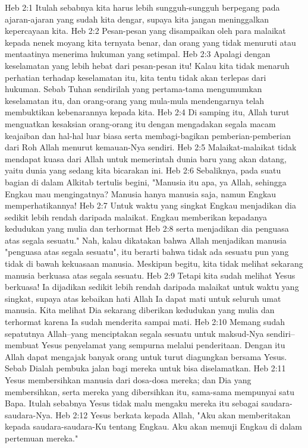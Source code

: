 Heb 2:1  Itulah sebabnya kita harus lebih sungguh-sungguh berpegang pada ajaran-ajaran yang sudah kita dengar, supaya kita jangan meninggalkan kepercayaan kita.
Heb 2:2  Pesan-pesan yang disampaikan oleh para malaikat kepada nenek moyang kita ternyata benar, dan orang yang tidak menuruti atau mentaatinya menerima hukuman yang setimpal.
Heb 2:3  Apalagi dengan keselamatan yang lebih hebat dari pesan-pesan itu! Kalau kita tidak menaruh perhatian terhadap keselamatan itu, kita tentu tidak akan terlepas dari hukuman. Sebab Tuhan sendirilah yang pertama-tama mengumumkan keselamatan itu, dan orang-orang yang mula-mula mendengarnya telah membuktikan kebenarannya kepada kita.
Heb 2:4  Di samping itu, Allah turut menguatkan kesaksian orang-orang itu dengan mengadakan segala macam keajaiban dan hal-hal luar biasa serta membagi-bagikan pemberian-pemberian dari Roh Allah menurut kemauan-Nya sendiri.
Heb 2:5  Malaikat-malaikat tidak mendapat kuasa dari Allah untuk memerintah dunia baru yang akan datang, yaitu dunia yang sedang kita bicarakan ini.
Heb 2:6  Sebaliknya, pada suatu bagian di dalam Alkitab tertulis begini, "Manusia itu apa, ya Allah, sehingga Engkau mau mengingatnya? Manusia hanya manusia saja, namun Engkau memperhatikannya!
Heb 2:7  Untuk waktu yang singkat Engkau menjadikan dia sedikit lebih rendah daripada malaikat. Engkau memberikan kepadanya kedudukan yang mulia dan terhormat
Heb 2:8  serta menjadikan dia penguasa atas segala sesuatu." Nah, kalau dikatakan bahwa Allah menjadikan manusia "penguasa atas segala sesuatu", itu berarti bahwa tidak ada sesuatu pun yang tidak di bawah kekuasaan manusia. Meskipun begitu, kita tidak melihat sekarang manusia berkuasa atas segala sesuatu.
Heb 2:9  Tetapi kita sudah melihat Yesus berkuasa! Ia dijadikan sedikit lebih rendah daripada malaikat untuk waktu yang singkat, supaya atas kebaikan hati Allah Ia dapat mati untuk seluruh umat manusia. Kita melihat Dia sekarang diberikan kedudukan yang mulia dan terhormat karena Ia sudah menderita sampai mati.
Heb 2:10  Memang sudah sepatutnya Allah--yang menciptakan segala sesuatu untuk maksud-Nya sendiri--membuat Yesus penyelamat yang sempurna melalui penderitaan. Dengan itu Allah dapat mengajak banyak orang untuk turut diagungkan bersama Yesus. Sebab Dialah pembuka jalan bagi mereka untuk bisa diselamatkan.
Heb 2:11  Yesus membersihkan manusia dari dosa-dosa mereka; dan Dia yang membersihkan, serta mereka yang dibersihkan itu, sama-sama mempunyai satu Bapa. Itulah sebabnya Yesus tidak malu mengaku mereka itu sebagai saudara-saudara-Nya.
Heb 2:12  Yesus berkata kepada Allah, "Aku akan memberitakan kepada saudara-saudara-Ku tentang Engkau. Aku akan memuji Engkau di dalam pertemuan mereka."
